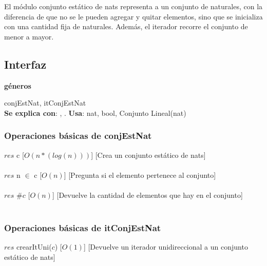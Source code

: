 El m\'odulo conjunto est\'atico de nats representa a un conjunto de naturales, con la diferencia de que no se le pueden agregar y quitar elementos, sino que se inicializa con una cantidad fija de naturales. Adem\'as, el iterador recorre el conjunto de menor a mayor.
\subsection{Interfaz}

   \parbox{1.7cm}{\textbf{g\'eneros}} conjEstNat, itConjEstNat\\

  \textbf{Se explica con}: , .
  \textbf{Usa}: nat, bool, Conjunto Lineal(nat)\\

  \subsubsection{Operaciones b\'asicas de conjEstNat}
  {$res$ \igobs c}
  [$O(n*(log (n)))$]
  [Crea un conjunto est\'atico de nats]\\\\
  
  {$res$ \igobs n $\in$ c}
  [$O(n)$]
  [Pregunta si el elemento pertenece al conjunto]\\\\

  {$res$ \igobs \#$c$}
  [$O(n)$]
  [Devuelve la cantidad de elementos que hay en el conjunto]\\\\  
  \subsubsection{Operaciones b\'asicas de itConjEstNat}  
  
  {$res$ \igobs crearItUni($c$)}
  [$O(1)$]
  [Devuelve un iterador unidireccional a un conjunto est\'atico de nats]\\\\
  
